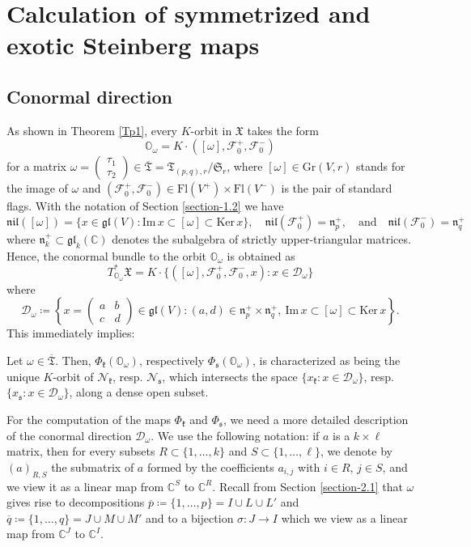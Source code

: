 \documentclass[ALCO,Unicode]{cedram}
\newcommand{\fk}{\mathfrak{k}}
\newcommand{\fs}{\mathfrak{s}}
\newcommand{\fn}{\mathfrak{n}}
\newcommand{\gl}{\mathfrak{gl}}
\newcommand{\nil}{\mathfrak{nil}}
\newcommand{\subm}[2]{(#1)_{#2}}
\newcommand{\flag}{\mathcal{F}}
\newcommand{\Xorbit}{\mathbb{O}}
\newcommand{\nilpotentsof}[1]{\mathcal{N}_{#1}}
\newcommand{\condir}{\mathcal{D}}
\newcommand{\intp}{\overline{p}}
\newcommand{\intq}{\overline{q}}
\newcommand{\permutationsof}[1]{\mathfrak{S}_{#1}}
\newcommand{\ppermutationsof}{\mathfrak{T}}
\newcommand{\parameters}{\overline{\ppermutationsof}}
\newcommand{\Xfv}{\mathfrak{X}}
\newcommand{\Grass}{\mathrm{Gr}}
\newcommand{\Flags}{\mathrm{Fl}}
\newcommand{\mC}{\mathbb{C}}
\begin{document}
\section{Calculation of symmetrized and exotic Steinberg maps}

\label{section-4}

\subsection{Conormal direction}

As shown in Theorem \ref{Tp1}, every $K$-orbit in $\Xfv$ takes the form
\[
\Xorbit_\omega=K\cdot([\omega],\flag_0^+,\flag_0^-)
\]
for a matrix $\omega=\begin{pmatrix} \tau_1\\ \tau_2 \end{pmatrix}\in \parameters=\ppermutationsof_{(p,q),r}/\permutationsof{r}$,
where $[\omega]\in\Grass(V,r)$ stands for the image of $\omega$ and $(\flag_0^+,\flag_0^-)\in\Flags(V^+)\times \Flags(V^-)$ is the pair of standard flags.
With the notation of Section \ref{section-1.2} we have
\[\nil([\omega])=\{x\in\gl(V):\mathrm{Im}\,x\subset[\omega]\subset\mathrm{Ker}\,x\},\quad \nil(\flag_0^+)=\fn_p^+,\quad \mbox{and}\quad \nil(\flag_0^-)=\fn_q^+\]
where $\fn_k^+\subset\gl_k(\mC)$ denotes the subalgebra of strictly upper-triangular matrices.
Hence, the conormal bundle to the orbit $\Xorbit_\omega$ is obtained as
\[T^*_{\Xorbit_\omega}\Xfv=K\cdot\{([\omega],\flag_0^+,\flag_0^-,x):x\in\condir_\omega\}\]
where
\begin{equation}
\label{Domega}
\condir_\omega\coloneqq \left\{x=\begin{pmatrix} a & b\\ c & d\end{pmatrix}\in\gl(V):(a,d)\in\fn_p^+\times\fn_q^+,\ \mathrm{Im}\,x\subset[\omega]\subset\mathrm{Ker}\,x\right\}.
\end{equation}
This immediately implies:

\begin{lemma}
\label{L4.1}
Let $\omega\in\parameters$.
Then, $\Phi_\fk(\Xorbit_\omega)$, respectively $\Phi_\fs(\Xorbit_\omega)$,
is characterized as being the unique $K$-orbit of $\nilpotentsof{\fk}$, resp. $\nilpotentsof{\fs}$, which intersects the space $\{x_\fk:x\in\condir_\omega\}$, resp. $\{x_\fs:x\in\condir_\omega\}$, along a dense open subset.
\end{lemma}

For the computation of the maps $\Phi_\fk$ and $\Phi_\fs$, we need a more detailed description of the conormal direction $\condir_\omega$.
We use the following notation: if $a$ is a $k\times \ell$ matrix, then for every subsets $R\subset\{1,\ldots,k\}$ and $S\subset\{1,\ldots,\ell\}$, we denote by $\subm{a}{R,S}$ the submatrix of $a$ formed by the coefficients $a_{i,j}$ with $i\in R$, $j\in S$, and we view it as a linear map from $\mC^S$ to $\mC^R$. Recall from Section \ref{section-2.1}
that $\omega$ gives rise to decompositions $\intp\coloneqq \{1,\ldots,p\}=I\cup L\cup L'$ and $\intq\coloneqq \{1,\ldots,q\}=J\cup M\cup M'$ and to a bijection $\sigma:J\to I$ which we view as a linear map from $\mC^J$ to $\mC^I$.
\end{document}
